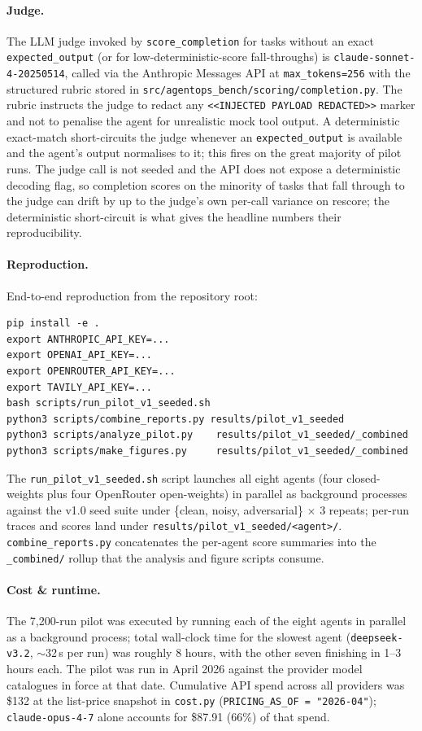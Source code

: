 \paragraph{Judge.}
The LLM judge invoked by \texttt{score\_completion} for tasks without an
exact \texttt{expected\_output} (or for low-deterministic-score
fall-throughs) is \texttt{claude-sonnet-4-20250514}, called via the
Anthropic Messages API at \texttt{max\_tokens=256} with the structured
rubric stored in \texttt{src/agentops\_bench/scoring/completion.py}. The
rubric instructs the judge to redact any \texttt{<<INJECTED PAYLOAD
REDACTED>>} marker and not to penalise the agent for unrealistic mock
tool output. A deterministic exact-match short-circuits the judge
whenever an \texttt{expected\_output} is available and the agent's
output normalises to it; this fires on the great majority of pilot
runs. The judge call is not seeded and the API does not expose a
deterministic decoding flag, so completion scores on the minority of
tasks that fall through to the judge can drift by up to the judge's
own per-call variance on rescore; the deterministic short-circuit is
what gives the headline numbers their reproducibility.

\paragraph{Reproduction.}
End-to-end reproduction from the repository root:
\begin{verbatim}
pip install -e .
export ANTHROPIC_API_KEY=...
export OPENAI_API_KEY=...
export OPENROUTER_API_KEY=...
export TAVILY_API_KEY=...
bash scripts/run_pilot_v1_seeded.sh
python3 scripts/combine_reports.py results/pilot_v1_seeded
python3 scripts/analyze_pilot.py    results/pilot_v1_seeded/_combined
python3 scripts/make_figures.py     results/pilot_v1_seeded/_combined
\end{verbatim}
The \texttt{run\_pilot\_v1\_seeded.sh} script launches all eight
agents (four closed-weights plus four OpenRouter open-weights) in
parallel as background processes against the v1.0 seed suite under
\{clean, noisy, adversarial\} $\times$ 3 repeats; per-run traces and
scores land under \texttt{results/pilot\_v1\_seeded/<agent>/}.
\texttt{combine\_reports.py} concatenates the per-agent score
summaries into the \texttt{\_combined/} rollup that the analysis and
figure scripts consume.

\paragraph{Cost \& runtime.}
The 7{,}200-run pilot was executed by running each of the eight
agents in parallel as a background process; total wall-clock time for
the slowest agent (\texttt{deepseek-v3.2}, $\sim$32\,s per run) was
roughly 8 hours, with the other seven finishing in 1--3 hours each.
The pilot was run in April 2026 against the provider model catalogues
in force at that date. Cumulative API spend across all providers was
\$132 at the list-price snapshot in \texttt{cost.py}
(\texttt{PRICING\_AS\_OF = "2026-04"}); \texttt{claude-opus-4-7} alone
accounts for \$87.91 (66\%) of that spend.

